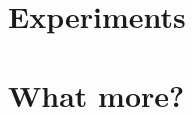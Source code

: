 \documentclass{beamer}
\begin{document}
	\section{Experiments} %
	\begin{frame}
	\end{frame}
	
	\section{What more?} %
	\begin{frame}
	\end{frame}
\end{document}
